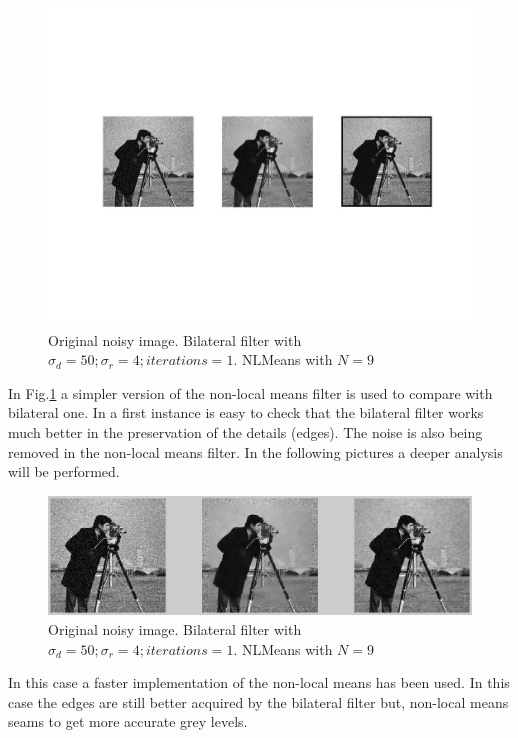 \documentclass[a4paper, 10pt, conference] {article}
\begin{document}
\begin{figure}[H]
	\centering
	\includegraphics[width=1\textwidth]{bilateralVSnlmeans.JPG} %
	\caption{Original noisy image. Bilateral filter with $\sigma_{d}=50; \sigma_{r}=4; iterations = 1$. NLMeans with $N = 9$}
	\label{vs1}
\end{figure}
In Fig.\ref{vs1} a simpler version of the non-local means filter is used to compare with bilateral one. In a first instance is easy to check that the bilateral filter works much better in the preservation of the details (edges). The noise is also being removed in the non-local means filter. In the following pictures a deeper analysis will be performed. 
\begin{figure}[H]
	\centering
	\includegraphics[width=1\textwidth]{bilateralVSnlmeans2.JPG} %
	\caption{Original noisy image. Bilateral filter with $\sigma_{d}=50; \sigma_{r}=4; iterations = 1$.  NLMeans with $N = 9$}
	\label{vs2}
\end{figure}
In this case a faster implementation of the non-local means has been used. In this case the edges are still better acquired by the bilateral filter but, non-local means seams to get more accurate grey levels.
\end{document}
